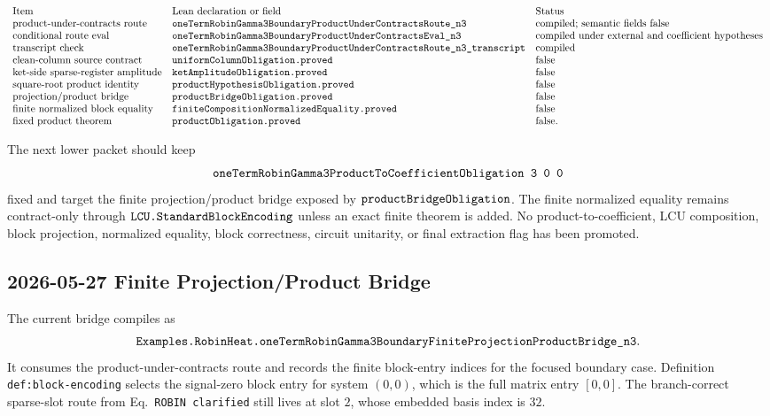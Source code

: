 \[
\begin{array}{lll}
\text{Item} & \text{Lean declaration or field} & \text{Status}\\
\text{product-under-contracts route} &
\texttt{oneTermRobinGamma3BoundaryProductUnderContractsRoute\_n3} &
\text{compiled; semantic fields false}\\
\text{conditional route eval} &
\texttt{oneTermRobinGamma3BoundaryProductUnderContractsEval\_n3} &
\text{compiled under external and coefficient hypotheses}\\
\text{transcript check} &
\texttt{oneTermRobinGamma3BoundaryProductUnderContractsRoute\_n3\_transcript} &
\text{compiled}\\
\text{clean-column source contract} &
\texttt{uniformColumnObligation.proved} & \text{false}\\
\text{ket-side sparse-register amplitude} &
\texttt{ketAmplitudeObligation.proved} & \text{false}\\
\text{square-root product identity} &
\texttt{productHypothesisObligation.proved} & \text{false}\\
\text{projection/product bridge} &
\texttt{productBridgeObligation.proved} & \text{false}\\
\text{finite normalized block equality} &
\texttt{finiteCompositionNormalizedEquality.proved} & \text{false}\\
\text{fixed product theorem} &
\texttt{productObligation.proved} & \text{false}.
\end{array}
\]

The next lower packet should keep
\[
  \Lean{oneTermRobinGamma3ProductToCoefficientObligation\ 3\ 0\ 0}
\]
fixed and target the finite projection/product bridge exposed by
\(\texttt{productBridgeObligation}\).  The finite normalized equality remains
contract-only through \(\texttt{LCU.StandardBlockEncoding}\) unless an exact
finite theorem is added.  No product-to-coefficient, LCU composition, block
projection, normalized equality, block correctness, circuit unitarity, or
final extraction flag has been promoted.

\subsection{2026-05-27 Finite Projection/Product Bridge}

The current bridge compiles as
\[
  \texttt{Examples.RobinHeat.oneTermRobinGamma3BoundaryFiniteProjectionProductBridge\_n3}.
\]
It consumes the product-under-contracts route and records the finite
block-entry indices for the focused boundary case.  Definition
\texttt{def:block-encoding} selects the signal-zero block entry for system
\((0,0)\), which is the full matrix entry \([0,0]\).  The branch-correct
sparse-slot route from Eq.~\texttt{ROBIN clarified} still lives at slot \(2\),
whose embedded basis index is \(32\).

